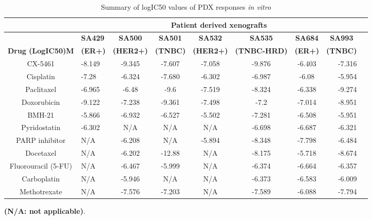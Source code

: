  \begin{table}[htbp]
   \centering
   \caption{Summary of logIC50 values of PDX responses \textit{in vitro}}
     \begin{tabular}{|c|p{5em}|c|c|c|c|c|r|r|}
        \hline
       & \multicolumn{7}{|c|}{\textbf{Patient derived xenografts}} \\
          \hline
       & \textbf{SA429} & \textbf{SA500} & \textbf{SA501} & \textbf{SA532} & \textbf{SA535} & \multicolumn{1}{|c|}{\textbf{SA684}} & \multicolumn{1}{|c|}{\textbf{SA993}}\\
     \multicolumn{1}{|l|}{\textbf{Drug (LogIC50)M}} & \textbf{(ER+)} & \textbf{(HER2+)} & \textbf{(TNBC)} & \textbf{(HER2+)} & \textbf{(TNBC-HRD)} & \multicolumn{1}{|c|}{\textbf{(ER+)}} & \multicolumn{1}{|c|}{\textbf{(TNBC)}} \\
        \hline
     CX-5461  & -8.149 & -9.345 & -7.607 & -7.058 & -9.876 & -6.403 & -7.316 \\
     Cisplatin  & -7.28 & -6.324 & -7.680 & -6.302 & -6.987 & -6.08 & -5.954 \\
     Paclitaxel  & -6.965 & -6.48 & -9.6 & -7.519 & -8.324 & -6.338 & -9.274 \\
     Doxorubicin  & -9.122 & -7.238 & -9.361 & -7.498 & -7.2 & -7.014 & -8.951 \\
     BMH-21  & -5.866 & -6.932 & -6.527 & -5.502 & -7.281 & -6.508 & -5.951 \\
     Pyridostatin & -6.302 & N/A & N/A & N/A & -6.698 & -6.687 & -6.321 \\
     PARP inhibitor  & N/A & -6.208 & N/A & -5.894 & -8.348 & -7.798 & -6.484 \\
     Docetaxel  & N/A & -6.202 & -12.88 & N/A & -8.175 & -5.718 & -8.674 \\
     Fluorouracil (5-FU)  & N/A & -6.467 & -5.999 & N/A & -6.374 & -6.664 & -6.357 \\
     Carboplatin  & N/A & -5.946 & N/A & N/A & -6.373 & -6.583 & -6.009 \\
     Methotrexate  & N/A & -7.576 & -7.203 & N/A & -7.589 & -6.088 & -7.794 \\
    
     \hline
     \end{tabular}%
   \label{tab:invitroIC50}%
   
   
    \small\textbf{ (N/A: not applicable)}.
 \end{table}%


